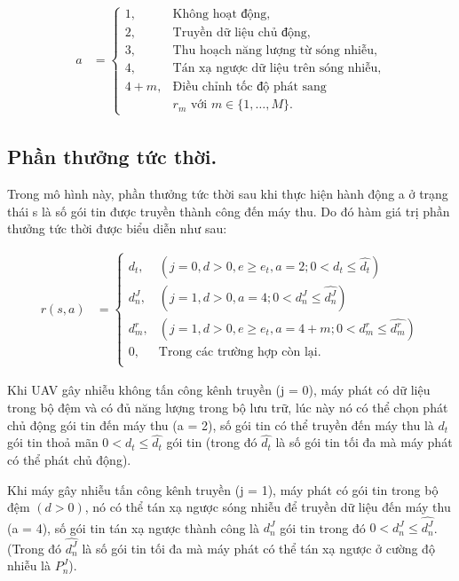 \documentclass{uetgraduation}
\begin{document}
\begin{align*}
    a &= \begin{cases}
        1, & \text{Không hoạt động,} \\
        2, & \text{Truyền dữ liệu chủ động,} \\
        3, & \text{Thu hoạch năng lượng từ sóng nhiễu,} \\
        4, & \text{Tán xạ ngược dữ liệu trên sóng nhiễu,} \\
        4 + m, & \text{Điều chỉnh tốc độ phát sang } \\
                & r_m \text{ với } m \in \{1, \ldots, M\}.
    \end{cases}
\end{align*}

\subsection{Phần thưởng tức thời.}
Trong mô hình này, phần thưởng tức thời sau khi thực hiện hành động a ở trạng thái s là số gói tin được truyền thành công đến máy thu. Do đó hàm giá
trị phần thưởng tức thời được biểu diễn như sau:

\begin{align*}
    r(s,a) &= \begin{cases}
        d_t, & (j = 0, d > 0, e \geq e_t, a = 2; 0 < d_t \leq \hat{d_t}) \\
        d_n^J, & (j = 1, d > 0, a = 4; 0 < d_n^J \leq \hat{d_n^J}) \\
        d_m^r, & (j = 1, d > 0, e \geq e_t, a = 4 + m; 0 < d_m^r \leq \hat{d_m^r}) \\
        0, & \text{Trong các trường hợp còn lại.} \\
    \end{cases}
\end{align*}

Khi UAV gây nhiễu không tấn công kênh truyền (j = 0), máy phát có dữ liệu trong bộ đệm và có đủ năng lượng trong bộ lưu trữ, lúc này nó có thể chọn phát
chủ động gói tin đến máy thu (a = 2), số gói tin có thể truyền đến máy thu là $d_t$ gói tin thoả mãn $0 < d_t \leq \hat{d_t}$ gói tin (trong đó $\hat{d_t}$
là số gói tin tối đa mà máy phát có thể phát chủ động).

Khi máy gây nhiễu tấn công kênh truyền (j = 1), máy phát có gói tin trong bộ đệm $(d > 0)$, nó có thể tán xạ ngược sóng nhiễu để truyền dữ liệu đến máy thu (a = 4), 
số gói tin tán xạ ngược thành công là $d_n^J$ gói tin trong đó $0 < d_n^J \leq \hat{d_n^J}$. (Trong đó $\hat{d_n^J}$ là số gói tin tối đa mà máy phát có thể tán xạ ngược
ở cường độ nhiễu là $P_n^J$).
\end{document}
